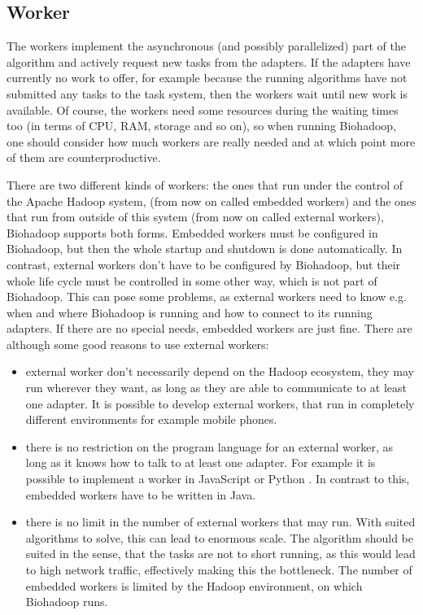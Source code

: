   \subsection{Worker}
  \label{chap:impl:worker}
  The workers implement the asynchronous (and possibly parallelized) part of the algorithm and actively request new tasks from the adapters. If the adapters have currently no work to offer, for example because the running algorithms have not submitted any tasks to the task system, then the workers wait until new work is available. Of course, the workers need some resources during the waiting times too (in terms of CPU, RAM, storage and so on), so when running Biohadoop, one should consider how much workers are really needed and at which point more of them are counterproductive.
  
  There are two different kinds of workers: the ones that run under the control of the Apache Hadoop system, (from now on called embedded workers) and the ones that run from outside of this system (from now on called external workers), Biohadoop supports both forms. Embedded workers must be configured in Biohadoop, but then the whole startup and shutdown is done automatically. In contrast, external workers don't have to be configured by Biohadoop, but their whole life cycle must be controlled in some other way, which is not part of Biohadoop. This can pose some problems, as external workers need to know e.g. when and where Biohadoop is running and how to connect to its running adapters. If there are no special needs, embedded workers are just fine. There are although some good reasons to use external workers:
  
  \begin{itemize}
    \item external worker don't necessarily depend on the Hadoop ecosystem, they may run wherever they want, as long as they are able to communicate to at least one adapter. It is possible to develop external workers, that run in completely different environments for example mobile phones.
    \item there is no restriction on the program language for an external worker, as long as it knows how to talk to at least one adapter. For example it is possible to implement a worker in JavaScript \cite{bioworker-browser} or Python \cite{bioworker-python}. In contrast to this, embedded workers have to be written in Java.
    \item there is no limit in the number of external workers that may run. With suited algorithms to solve, this can lead to enormous scale. The algorithm should be suited in the sense, that the tasks are not to short running, as this would lead to high network traffic, effectively making this the bottleneck. The number of embedded workers is limited by the Hadoop environment, on which Biohadoop runs.
  \end{itemize}

